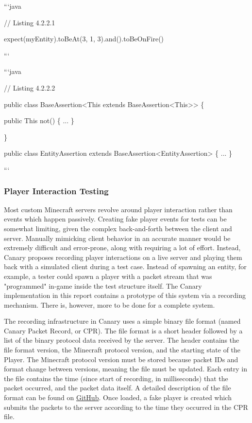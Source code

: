 \documentclass{article}
\begin{document}
\begin{onehalfspacing}
```java

// Listing 4.2.2.1

expect(myEntity).toBeAt(3, 1, 3).and().toBeOnFire()

```

```java

// Listing 4.2.2.2

public class BaseAssertion\textless This extends
BaseAssertion\textless This\textgreater\textgreater{} \{

public This not() \{ ... \}

\}

public class EntityAssertion extends
BaseAssertion\textless EntityAssertion\textgreater{} \{ ... \}

```

\subsubsection{Player Interaction Testing}

Most custom Minecraft servers revolve around player interaction rather
than events which happen passively. Creating fake player events for
tests can be somewhat limiting, given the complex back-and-forth between
the client and server. Manually mimicking client behavior in an accurate
manner would be extremely difficult and error-prone, along with
requiring a lot of effort. Instead, Canary proposes recording player
interactions on a live server and playing them back with a simulated
client during a test case. Instead of spawning an entity, for example, a
tester could spawn a player with a packet stream that was "programmed"
in-game inside the test structure itself. The Canary implementation in
this report contains a prototype of this system via a recording
mechanism. There is, however, more to be done for a complete system.

The recording infrastructure in Canary uses a simple binary file format
(named Canary Packet Record, or CPR). The file format is a short header
followed by a list of the binary protocol data received by the server.
The header contains the file format version, the Minecraft protocol
version, and the starting state of the Player. The Minecraft protocol
version must be stored because packet IDs and format change between
versions, meaning the file must be updated. Each entry in the file
contains the time (since start of recording, in milliseconds) that the
packet occurred, and the packet data itself. A detailed description of
the file format can be found on
\href{https://gist.github.com/mworzala/13abec46e1114bde479cb0c9e7e8d888}{{GitHub}}.
Once loaded, a fake player is created which submits the packets to the
server according to the time they occurred in the CPR file.


\end{onehalfspacing}
\end{document}
